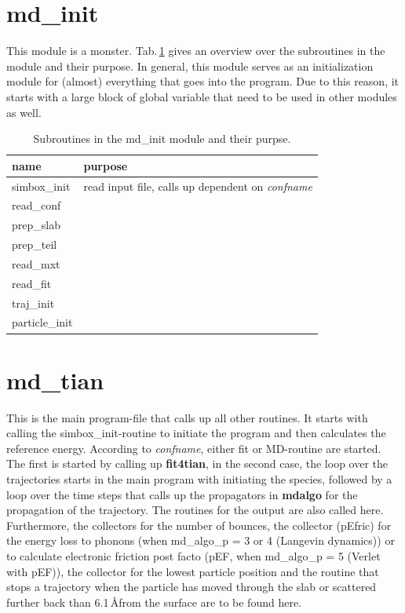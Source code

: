 \documentclass[twoside, 11pt, titlepage, captions=nooneline, a4paper, headsepline]{scrbook}%
\newcommand{\9}{\mathrm}
\newcommand{\0}{\,\mathrm}
\begin{document}
\section{md\_init}
This module is a monster. Tab.\,\ref{Tab:Funct:mdinit} gives an overview over the subroutines in the module and their purpose. In general, this module serves as an initialization module for (almost) everything that goes into the program. Due to this reason, it starts with a large block of global variable that need to be used in other modules as well.
\begin{table}[b!]
\centering
\caption{Subroutines in the md\_init module and their purpse.}
\label{Tab:Funct:mdinit}
\begin{tabular}{ll}
\hline\hline
name			&purpose			\\
\hline
simbox\_init & read input file, calls up dependent on \textit{confname}\\
read\_conf&\\
prep\_slab&\\
prep\_teil&\\
read\_mxt&\\
read\_fit&\\
traj\_init&\\
particle\_init&\\

\hline
\hline
\end{tabular}
\end{table}

\section{md\_tian}
This is the main program-file that calls up all other routines. It starts with calling the simbox\_init-routine to initiate the program and then calculates the reference energy. According to \textit{confname}, either fit or MD-routine are started. The first is started by calling up \textbf{fit4tian}, in the second case, the loop over the trajectories starts in the main program with initiating the species, followed by a loop over the time steps that calls up the propagators in \textbf{mdalgo} for the propagation of the trajectory. The routines for the output are also called here. Furthermore, the collectors for the number of bounces, the collector (pEfric) for the energy loss to phonons (when md\_algo\_p = 3 or 4 (Langevin dynamics)) or to calculate electronic friction post facto (pEF, when md\_algo\_p = 5 (Verlet with pEF)), the collector for the lowest particle position and the routine that stops a trajectory when the particle has moved through the slab or scattered further back than 6.1\,\AA from the surface are to be found here.
\end{document}
